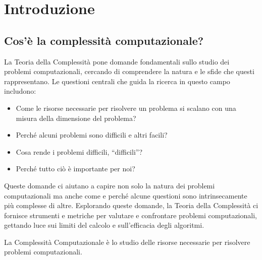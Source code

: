 \chapter{Introduzione}
\section{Cos'è la complessità computazionale?}

La Teoria della Complessità pone domande fondamentali sullo studio dei problemi
computazionali, cercando di comprendere la natura e le sfide che questi rappresentano.
Le questioni centrali che guida la ricerca in questo campo includono:

\begin{itemize}
    \item Come le risorse necessarie per risolvere un problema si scalano con una misura
    della dimensione del problema?
    \item Perché alcuni problemi sono difficili e altri facili?
    \item Cosa rende i problemi difficili, ``difficili''?
    \item Perché tutto ciò è importante per noi?
\end{itemize}

Queste domande ci aiutano a capire non solo la natura dei problemi computazionali
ma anche come e perché alcune questioni sono intrinsecamente più complesse di altre.
Esplorando queste domande, la Teoria della Complessità ci fornisce strumenti e metriche
per valutare e confrontare problemi computazionali, gettando luce sui limiti del calcolo
e sull'efficacia degli algoritmi.

\begin{pastelbox1}[title=Definizione di Complessità Computazionale]
    La Complessità Computazionale è lo studio delle risorse necessarie per risolvere
    problemi computazionali.
\end{pastelbox1}

